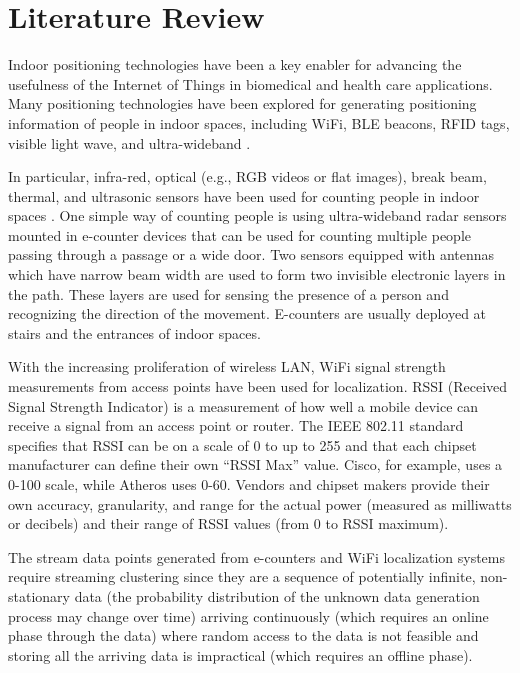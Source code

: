 \setlength{\parindent}{2em}
% 
\chapter{Literature Review}

Indoor positioning technologies have been a key enabler for advancing the usefulness of the Internet of Things in biomedical and health care applications. Many positioning technologies have been explored for generating positioning information of people in indoor spaces, including WiFi, BLE beacons, RFID tags, visible light wave, and ultra-wideband \cite{namiot2015indoor, jeon2018ble}. 

In particular, infra-red, optical (e.g., RGB videos or flat images), break beam, thermal, and ultrasonic sensors have been used for counting people in indoor spaces \cite{mautz2012indoor}. One simple way of counting people is using ultra-wideband radar sensors mounted in e-counter devices that can be used for counting multiple people passing through a passage or a wide door. Two sensors equipped with antennas which have narrow beam width are used to form two invisible electronic layers in the path. These layers are used for sensing the presence of a person and recognizing the direction of the movement.  E-counters are usually deployed at stairs and the entrances of indoor spaces. 

With the increasing proliferation of wireless LAN, WiFi signal strength measurements from access points have been used for localization. RSSI (Received Signal Strength Indicator) is a measurement of how well a mobile device can receive a signal from an access point or router. The IEEE 802.11 standard specifies that RSSI can be on a scale of 0 to up to 255 and that each chipset manufacturer can define their own “RSSI Max” value. Cisco, for example, uses a 0-100 scale, while Atheros uses 0-60. Vendors and chipset makers provide their own accuracy, granularity, and range for the actual power (measured as milliwatts or decibels) and their range of RSSI values (from 0 to RSSI maximum). 

The stream data points generated from e-counters and WiFi localization systems require streaming clustering since they are a sequence of potentially infinite, non-stationary data (the probability distribution of the unknown data generation process may change over time) arriving continuously (which requires an online phase through the data) where random access to the data is not feasible and storing all the arriving data is impractical (which requires an offline phase). 




